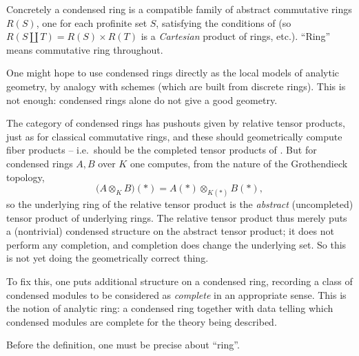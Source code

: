\begin{remark}
\label{rmk:1:condensed-ring-pointwise}
Concretely a condensed ring is a compatible family of abstract commutative rings
$R(S)$, one for each profinite set $S$, satisfying the conditions of
 (so $R(S\amalg T)=R(S)\times R(T)$ is a
\emph{Cartesian} product of rings, etc.). ``Ring'' means commutative ring
throughout.
\end{remark}

One might hope to use condensed rings directly as the local models of analytic
geometry, by analogy with schemes (which are built from discrete rings). This is
not enough: condensed rings alone do not give a good geometry.

\begin{remark}
\label{rmk:1:condensed-rings-insufficient}
The category of condensed rings has pushouts given by relative tensor products,
just as for classical commutative rings, and these should geometrically compute
fiber products -- i.e.\ should be the completed tensor products of
. But for condensed rings $A,B$ over $K$ one computes,
from the nature of the Grothendieck topology,
\begin{equation*}
\bigl(A\otimes_{K} B\bigr)(\ast)=A(\ast)\otimes_{K(\ast)} B(\ast),
\end{equation*}
so the underlying ring of the relative tensor product is the \emph{abstract}
(uncompleted) tensor product of underlying rings. The relative tensor product
thus merely puts a (nontrivial) condensed structure on the abstract tensor
product; it does not perform any completion, and completion does change the
underlying set. So this is not yet doing the geometrically correct thing.
\end{remark}

To fix this, one puts additional structure on a condensed ring, recording a class
of condensed modules to be considered as \emph{complete} in an appropriate sense.
This is the notion of analytic ring: a condensed ring together with data telling
which condensed modules are complete for the theory being described.

Before the definition, one must be precise about ``ring''.

